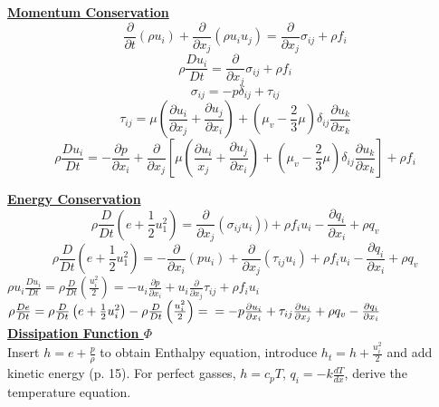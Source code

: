 \documentclass[8pt, landscape, fleqn]{scrartcl}
\begin{document}
\begin{multicols*}{3}
\underline{\textbf{Momentum Conservation}}
\begin{equation*}
    \frac{\partial}{\partial t} (\rho u_i) + \frac{\partial}{\partial x_j} (\rho u_i u_j) = \frac{\partial}{\partial x_j} \sigma_{ij} + \rho f_i
\end{equation*}
\begin{equation*}
    \rho \frac{D u_i}{Dt} = \frac{\partial}{\partial x_j} \sigma_{ij} + \rho f_i
\end{equation*}
\begin{equation*}
    \sigma_{ij} = -p \delta_{ij} + \tau_{ij}
\end{equation*}
\begin{equation*}
    \tau_{ij} = \mu\left(\frac{\partial u_i}{ \partial x_j} + \frac{\partial u_j}{\partial x_i}\right) + \left( \mu_v - \frac{2}{3} \mu\right) \delta_{ij} \frac{\partial u_k}{\partial x_k}
\end{equation*}
\begin{equation*}
    \rho \frac{D u_i}{D t} = -\frac{\partial p}{\partial x_i} + \frac{\partial}{\partial x_j}\left[\mu \left( \frac{\partial u_i}{x_j} + \frac{\partial u_j}{\partial x_i}\right) + \left( \mu_v - \frac{2}{3}\mu\right) \delta_{ij} \frac{\partial u_k}{\partial x_k}\right] + \rho f_i
\end{equation*}

\underline{\textbf{Energy Conservation}}
\begin{equation*}
    \rho \frac{D}{Dt}(e + \frac{1}{2} u_1^2 ) = \frac{\partial}{\partial x_j} (\sigma_{ij} u_i)) + \rho f_i u_i - \frac{\partial q_i}{\partial x_i} + \rho q_v 
\end{equation*}
\begin{equation*} \rho \frac{D}{Dt}(e + \frac{1}{2} u_1^2 ) = -\frac{\partial}{\partial x_i}(pu_i) + \frac{\partial }{\partial x_j}(\tau_{ij} u_i) + \rho f_i u_i - \frac{\partial q_i}{\partial x_i} + \rho q_v
\end{equation*}
    $\rho u_i \frac{D u_i}{Dt} = \rho \frac{D}{Dt}\left(\frac{u_i^2}{2}\right) = -u_i \frac{\partial p}{\partial x_i} + u_i \frac{\partial}{\partial x_j} \tau_{ij} + \rho f_i u_i$
    $\rho \frac{D e}{D t} = \rho \frac{D}{Dt}\left(e + \frac{1}{2} u_i^2 \right) - \rho \frac{D}{Dt}\left( \frac{u_i^2}{2}\right) = \\ = -p \frac{\partial u_i}{\partial x_i} + \tau_{ij} \frac{\partial u_i}{\partial x_j} + \rho q_v - \frac{\partial q_i}{\partial x_i}$ \\

\underline{\textbf{Dissipation Function $ \Phi $}} \\
Insert $h = e + \frac{p}{\rho}$ to obtain Enthalpy equation, introduce $h_t = h + \frac{u_i^2}{2}$ and add kinetic energy (p. 15). For perfect gasses, $h = c_p T$, $q_i = -k \frac{dT}{dx}$, derive the temperature equation. \\


\end{multicols*}
\end{document}
